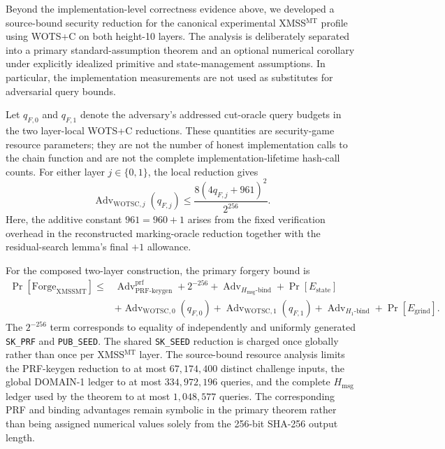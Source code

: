 Beyond the implementation-level correctness evidence above, we developed a
source-bound security reduction for the canonical experimental
XMSS$^{\mathrm{MT}}$ profile using WOTS+C on both height-10 layers. The
analysis is deliberately separated into a primary standard-assumption theorem
and an optional numerical corollary under explicitly idealized primitive and
state-management assumptions. In particular, the implementation measurements
are not used as substitutes for adversarial query bounds.

Let $q_{F,0}$ and $q_{F,1}$ denote the adversary's addressed cut-oracle query
budgets in the two layer-local WOTS+C reductions. These quantities are
security-game resource parameters; they are not the number of honest
implementation calls to the chain function and are not the complete
implementation-lifetime hash-call counts. For either layer $j\in\{0,1\}$,
the local reduction gives
\[
  \operatorname{Adv}_{\mathrm{WOTSC},j}(q_{F,j})
  \le
  \frac{8(4q_{F,j}+961)^2}{2^{256}}.
\]
Here, the additive constant $961=960+1$ arises from the fixed verification
overhead in the reconstructed marking-oracle reduction together with the
residual-search lemma's final $+1$ allowance.

For the composed two-layer construction, the primary forgery bound is
\[
\begin{aligned}
\Pr[\mathrm{Forge}_{\mathrm{XMSSMT}}]
\le{}&
  \operatorname{Adv}^{\mathrm{prf}}_{\mathrm{PRF\mbox{-}keygen}}
  + 2^{-256}
  + \operatorname{Adv}_{H_{\mathrm{msg}}\text{-}\mathrm{bind}}
  + \Pr[E_{\mathrm{state}}] \\
 &+
  \operatorname{Adv}_{\mathrm{WOTSC},0}(q_{F,0})
  + \operatorname{Adv}_{\mathrm{WOTSC},1}(q_{F,1})
  + \operatorname{Adv}_{H_1\text{-}\mathrm{bind}}
  + \Pr[E_{\mathrm{grind}}].
\end{aligned}
\]
The $2^{-256}$ term corresponds to equality of independently and uniformly
generated \texttt{SK\_PRF} and \texttt{PUB\_SEED}. The shared
\texttt{SK\_SEED} reduction is charged once globally rather than once per
XMSS$^{\mathrm{MT}}$ layer. The source-bound resource analysis limits the
PRF-keygen reduction to at most $67{,}174{,}400$ distinct challenge inputs,
the global DOMAIN-1 ledger to at most $334{,}972{,}196$ queries, and the
complete $H_{\mathrm{msg}}$ ledger used by the theorem to at most
$1{,}048{,}577$ queries. The corresponding PRF and binding advantages remain
symbolic in the primary theorem rather than being assigned numerical values
solely from the 256-bit SHA-256 output length.

